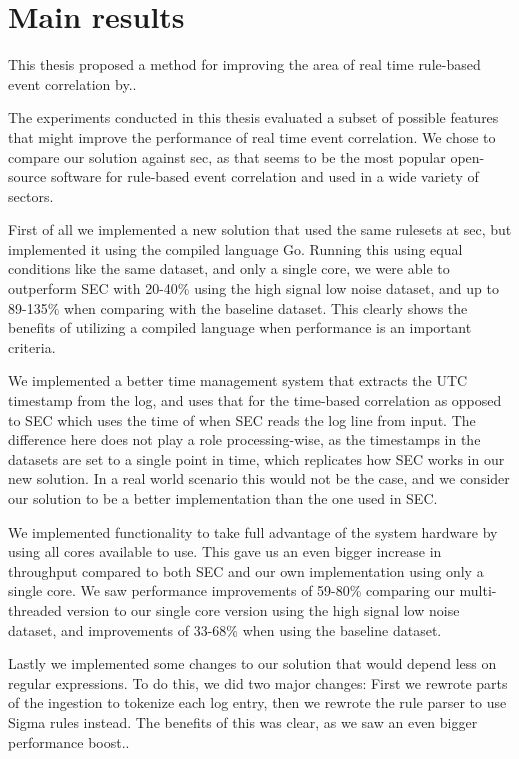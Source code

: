 




\section{Main results}

This thesis proposed a method for improving the area of real time rule-based event correlation by..

The experiments conducted in this thesis evaluated a subset of possible features that might improve the performance of real time event correlation.
We chose to compare our solution against \acrshort{sec}, as that seems to be the most popular open-source software for rule-based event correlation and used in a wide variety of sectors. 

First of all we implemented a new solution that used the same rulesets at \acrshort{sec}, but implemented it using the compiled language Go. Running this using equal conditions like the same dataset, and only a single core, we were able to outperform SEC with 20-40\% using the high signal low noise dataset, and up to 89-135\% when comparing with the baseline dataset. This clearly shows the benefits of utilizing a compiled language when performance is an important criteria.

We implemented a better time management system that extracts the UTC timestamp from the log, and uses that for the time-based correlation as opposed to SEC which uses the time of when SEC reads the log line from input. The difference here does not play a role processing-wise, as the timestamps in the datasets are set to a single point in time, which replicates how SEC works in our new solution. In a real world scenario this would not be the case, and we consider our solution to be a better implementation than the one used in SEC.

We implemented functionality to take full advantage of the system hardware by using all cores available to use. This gave us an even bigger increase in throughput compared to both SEC and our own implementation using only a single core. We saw performance improvements of 59-80\% comparing our multi-threaded version to our single core version using the high signal low noise dataset, and improvements of 33-68\% when using the baseline dataset.

Lastly we implemented some changes to our solution that would depend less on regular expressions. To do this, we did two major changes: First we rewrote parts of the ingestion to tokenize each log entry, then we rewrote the rule parser to use Sigma rules instead. The benefits of this was clear, as we saw an even bigger performance boost..


